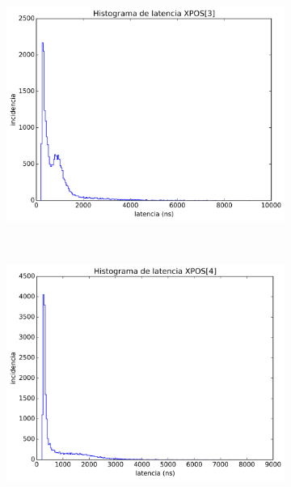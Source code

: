 \begin{figure}[ht!]
\begin{center}
\begin{subfigure}[b]{0.4\textwidth}
		    \caption{}
		    \label{fig:histograma_7}
	    \end{subfigure}
	    ~ %
	    \begin{subfigure}[b]{0.4\textwidth}
	    	\includegraphics[width=\textwidth]{figures/ch6_histograma_source_8.png}
		    \caption{}
		    \label{fig:histograma_8}
	    \end{subfigure}
	    ~ %
	    \begin{subfigure}[b]{0.4\textwidth}
	    	\includegraphics[width=\textwidth]{figures/ch6_histograma_source_9.png}

\end{subfigure}
\end{center}
\end{figure}
